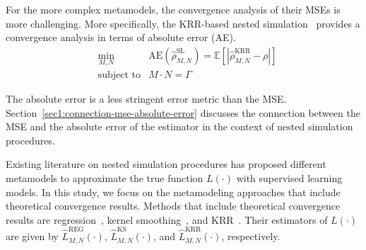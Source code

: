 For the more complex metamodels, the convergence analysis of their MSEs is more challenging.
More specifically, the KRR-based nested simulation~\citep{wang2022smooth} provides a convergence analysis in terms of absolute error (AE).
\begin{align} \label{eq1:ae}
    & \min_{M, N}  & \text{AE}(\hat{\rho}^{\text{SL}}_{M, N}) = \mathbb{E} \left[ \left| \hat{\rho}^{\text{KRR}}_{M, N} - \rho \right| \right] \nonumber \\
    & \text{subject to} & M \cdot N = \Gamma 
\end{align}

The absolute error is a less stringent error metric than the MSE. 
Section~\ref{sec1:connection-mse-absolute-error} discusses the connection between the MSE and the absolute error of the estimator in the context of nested simulation procedures.

Existing literature on nested simulation procedures has proposed different metamodels to approximate the true function $L(\cdot)$ with supervised learning models. 
In this study, we focus on the metamodeling approaches that include theoretical convergence results.
Methods that include theoretical convergence results are regression~\citep{broadie2015risk}, kernel smoothing~\citep{hong2017kernel}, and KRR~\citep{wang2022smooth}.
Their estimators of $L(\cdot)$ are given by $\hat{L}^{\text{REG}}_{M, N}(\cdot)$, $\hat{L}^{\text{KS}}_{M, N}(\cdot)$, and $\hat{L}^{\text{KRR}}_{M, N}(\cdot)$, respectively.

